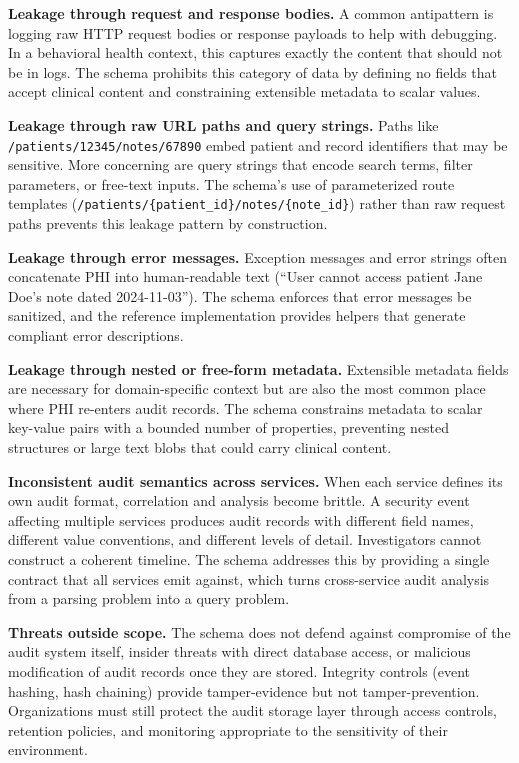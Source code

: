 \documentclass[11pt,a4paper]{article}
\begin{document}
\textbf{Leakage through request and response bodies.} A common antipattern is logging raw HTTP request bodies or response payloads to help with debugging. In a behavioral health context, this captures exactly the content that should not be in logs. The schema prohibits this category of data by defining no fields that accept clinical content and constraining extensible metadata to scalar values.

\textbf{Leakage through raw URL paths and query strings.} Paths like \texttt{/patients/12345/notes/67890} embed patient and record identifiers that may be sensitive. More concerning are query strings that encode search terms, filter parameters, or free-text inputs. The schema's use of parameterized route templates (\texttt{/patients/\{patient\_id\}/notes/\{note\_id\}}) rather than raw request paths prevents this leakage pattern by construction.

\textbf{Leakage through error messages.} Exception messages and error strings often concatenate PHI into human-readable text (``User cannot access patient Jane Doe's note dated 2024-11-03''). The schema enforces that error messages be sanitized, and the reference implementation provides helpers that generate compliant error descriptions.

\textbf{Leakage through nested or free-form metadata.} Extensible metadata fields are necessary for domain-specific context but are also the most common place where PHI re-enters audit records. The schema constrains metadata to scalar key-value pairs with a bounded number of properties, preventing nested structures or large text blobs that could carry clinical content.

\textbf{Inconsistent audit semantics across services.} When each service defines its own audit format, correlation and analysis become brittle. A security event affecting multiple services produces audit records with different field names, different value conventions, and different levels of detail. Investigators cannot construct a coherent timeline. The schema addresses this by providing a single contract that all services emit against, which turns cross-service audit analysis from a parsing problem into a query problem.

\textbf{Threats outside scope.} The schema does not defend against compromise of the audit system itself, insider threats with direct database access, or malicious modification of audit records once they are stored. Integrity controls (event hashing, hash chaining) provide tamper-evidence but not tamper-prevention. Organizations must still protect the audit storage layer through access controls, retention policies, and monitoring appropriate to the sensitivity of their environment.
\end{document}
